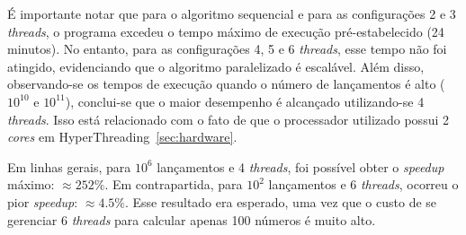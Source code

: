 \documentclass[12pt,a4paper]{article}
\begin{document}
É importante notar que para o algoritmo sequencial e para as configurações 2 e 3
\textit{threads}, o programa excedeu o tempo máximo de execução pré-estabelecido
(24 minutos). No entanto, para as configurações 4, 5 e 6 \textit{threads}, esse
tempo não foi atingido, evidenciando que o algoritmo paralelizado é escalável.
Além disso, observando-se os tempos de execução quando o número de lançamentos é
alto ($10^{10}$ e $10^{11}$), conclui-se que o maior desempenho é alcançado
utilizando-se 4 \textit{threads}. Isso está relacionado com o fato de que o
processador utilizado possui 2 \textit{cores} em
HyperThreading~\ref{sec:hardware}.

Em linhas gerais, para $10^{6}$ lançamentos e 4 \textit{threads}, foi possível
obter o \textit{speedup} máximo: $\approx 252\%$. Em contrapartida, para
$10^{2}$ lançamentos e 6 \textit{threads}, ocorreu o pior \textit{speedup}:
$\approx 4.5\%$. Esse resultado era esperado, uma vez que o custo de se
gerenciar 6 \textit{threads} para calcular apenas 100 números é muito alto.


\end{document}
